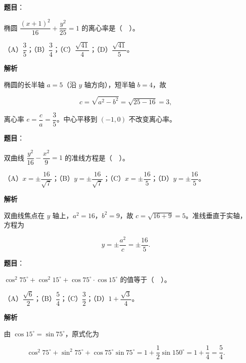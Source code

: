 \begin{answer}

\textbf{题目}：

椭圆 $\dfrac{(x+1)^2}{16}+\dfrac{y^2}{25}=1$ 的离心率是（　）。

（A）$\dfrac35$；（B）$\dfrac34$；（C）$\dfrac{\sqrt{41}}{4}$；（D）$\dfrac{\sqrt{41}}{5}$。

\textbf{解析}

椭圆的长半轴 $a=5$（沿 $y$ 轴方向），短半轴 $b=4$，故

\nopagebreak[4]
\[
c=\sqrt{a^2-b^2}=\sqrt{25-16}=3,
\]

离心率 $e=\dfrac{c}{a}=\dfrac35$。中心平移到 $(-1,0)$ 不改变离心率。


\end{answer}
\begin{answer}

\textbf{题目}：

双曲线 $\dfrac{y^2}{16}-\dfrac{x^2}{9}=1$ 的准线方程是（　）。

（A）$x=\pm\dfrac{16}{\sqrt7}$；（B）$y=\pm\dfrac{16}{\sqrt7}$；（C）$x=\pm\dfrac{16}{5}$；（D）$y=\pm\dfrac{16}{5}$。

\textbf{解析}

双曲线焦点在 $y$ 轴上，$a^2=16$，$b^2=9$，故 $c=\sqrt{16+9}=5$。准线垂直于实轴，方程为

\nopagebreak[4]
\[
y=\pm\frac{a^2}{c}=\pm\frac{16}{5}.
\]


\end{answer}
\begin{answer}

\textbf{题目}：

$\cos^2 75^\circ+\cos^2 15^\circ+\cos 75^\circ\cdot\cos 15^\circ$ 的值等于（　）。

（A）$\dfrac{\sqrt6}{2}$；（B）$\dfrac54$；（C）$\dfrac32$；（D）$1+\dfrac{\sqrt3}{4}$。

\textbf{解析}

由 $\cos 15^\circ=\sin 75^\circ$，原式化为

\nopagebreak[4]
\[
\cos^2 75^\circ+\sin^2 75^\circ+\cos 75^\circ\sin 75^\circ
=1+\frac12\sin 150^\circ
=1+\frac14=\frac54.
\]


\end{answer}
